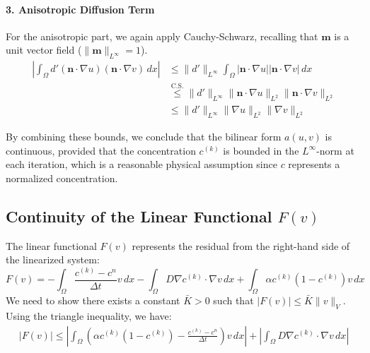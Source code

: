 \documentclass[12pt, a4paper, twoside, openright]{report}
\begin{document}
      \paragraph{3. Anisotropic Diffusion Term}
      For the anisotropic part, we again apply Cauchy-Schwarz, recalling that $\mathbf{m}$ is a unit vector field ($\|\mathbf{m}\|_{L^\infty} = 1$).
      \begin{align*}
      \left| \int_{\Omega} d' (\mathbf{n} \cdot \nabla u)(\mathbf{n} \cdot \nabla v) \, dx \right|
      &\leq \|d'\|_{L^\infty} \int_{\Omega} |\mathbf{n} \cdot \nabla u| |\mathbf{n} \cdot \nabla v| \, dx \\
        &\overset{\text{C.S.}}{\leq} \|d'\|_{L^\infty} \|\mathbf{n} \cdot \nabla u\|_{L^2} \|\mathbf{n} \cdot \nabla v\|_{L^2} \\
        &\leq \|d'\|_{L^\infty} \|\nabla u\|_{L^2} \|\nabla v\|_{L^2}
        \end{align*}

        By combining these bounds, we conclude that the bilinear form $a(u,v)$ is continuous, provided that the concentration $c^{(k)}$ is bounded in the $L^\infty$-norm at each iteration, which is a reasonable physical assumption since $c$ represents a normalized concentration.

        \subsection{Continuity of the Linear Functional $F(v)$}

        The linear functional $F(v)$ represents the residual from the right-hand side of the linearized system:
        \[
          F(v) = - \int_{\Omega} \frac{c^{(k)} - c^n}{\Delta t} v \, dx - \int_{\Omega} D \nabla c^{(k)} \cdot \nabla v \, dx + \int_{\Omega} \alpha c^{(k)}(1-c^{(k)}) v \, dx
            \]
              We need to show there exists a constant $\bar{K} > 0$ such that $|F(v)| \leq \bar{K} \|v\|_{V}$. Using the triangle inequality, we have:
              \begin{align*}
            |F(v)| \leq \left| \int_{\Omega} \left( \alpha c^{(k)}(1-c^{(k)}) - \frac{c^{(k)} - c^n}{\Delta t} \right) v \, dx \right| + \left| \int_{\Omega} D \nabla c^{(k)} \cdot \nabla v \, dx \right|
              \end{align*}
\end{document}
